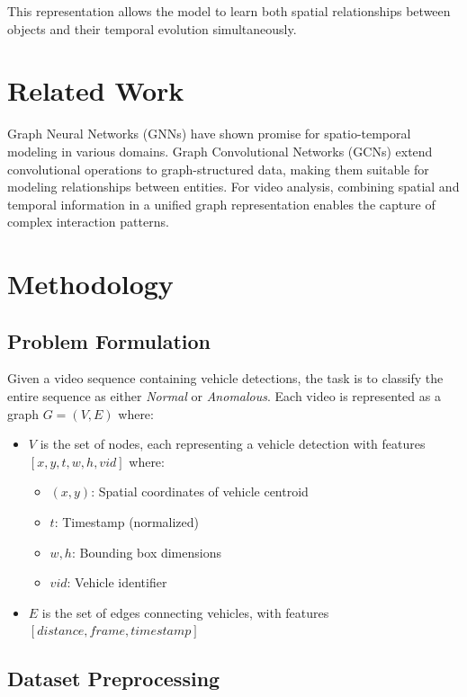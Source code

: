 \documentclass[11pt,a4paper]{article}
\begin{document}
This representation allows the model to learn both spatial relationships between objects and their temporal evolution simultaneously.

\section{Related Work}

Graph Neural Networks (GNNs) have shown promise for spatio-temporal modeling in various domains. Graph Convolutional Networks (GCNs) extend convolutional operations to graph-structured data, making them suitable for modeling relationships between entities. For video analysis, combining spatial and temporal information in a unified graph representation enables the capture of complex interaction patterns.

\section{Methodology}

\subsection{Problem Formulation}

Given a video sequence containing vehicle detections, the task is to classify the entire sequence as either \textit{Normal} or \textit{Anomalous}. Each video is represented as a graph $G = (V, E)$ where:
\begin{itemize}
    \item $V$ is the set of nodes, each representing a vehicle detection with features $[x, y, t, w, h, vid]$ where:
    \begin{itemize}
        \item $(x, y)$: Spatial coordinates of vehicle centroid
        \item $t$: Timestamp (normalized)
        \item $w, h$: Bounding box dimensions
        \item $vid$: Vehicle identifier
    \end{itemize}
    \item $E$ is the set of edges connecting vehicles, with features $[distance, frame, timestamp]$
\end{itemize}

\subsection{Dataset Preprocessing}
\end{document}
